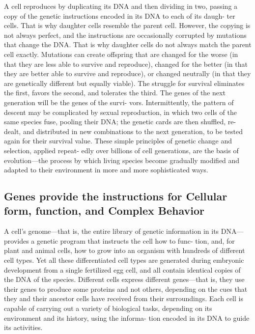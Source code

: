 A cell reproduces by duplicating its DNA and then dividing in two, passing
a copy of the genetic instructions encoded in its DNA to each of its daugh-
ter cells. That is why daughter cells resemble the parent cell. However,
the copying is not always perfect, and the instructions are occasionally
corrupted by mutations that change the DNA. That is why daughter cells
do not always match the parent cell exactly.
Mutations can create offspring that are changed for the worse (in that
they are less able to survive and reproduce), changed for the better (in
that they are better able to survive and reproduce), or changed neutrally
(in that they are genetically different but equally viable). The struggle
for survival eliminates the first, favors the second, and tolerates the
third. The genes of the next generation will be the genes of the survi-
vors. Intermittently, the pattern of descent may be complicated by sexual
reproduction, in which two cells of the same species fuse, pooling their
DNA; the genetic cards are then shuffled, re-dealt, and distributed in new
combinations to the next generation, to be tested again for their survival
value.
These simple principles of genetic change and selection, applied repeat-
edly over billions of cell generations, are the basis of evolution—the
process by which living species become gradually modified and adapted
to their environment in more and more sophisticated ways.

\subsection{Genes provide the instructions for Cellular form, function, and Complex Behavior}

A cell’s genome—that is, the entire library of genetic information in its
DNA—provides a genetic program that instructs the cell how to func-
tion, and, for plant and animal cells, how to grow into an organism with
hundreds of different cell types.
Yet all these differentiated cell types are generated during
embryonic development from a single fertilized egg cell, and all contain
identical copies of the DNA of the species.
Different
cells express different genes—that is, they use their genes to produce
some proteins and not others, depending on the cues that they and their
ancestor cells have received from their surroundings.
Each cell is capable of carrying out a variety of biological
tasks, depending on its environment and its history, using the informa-
tion encoded in its DNA to guide its activities.

